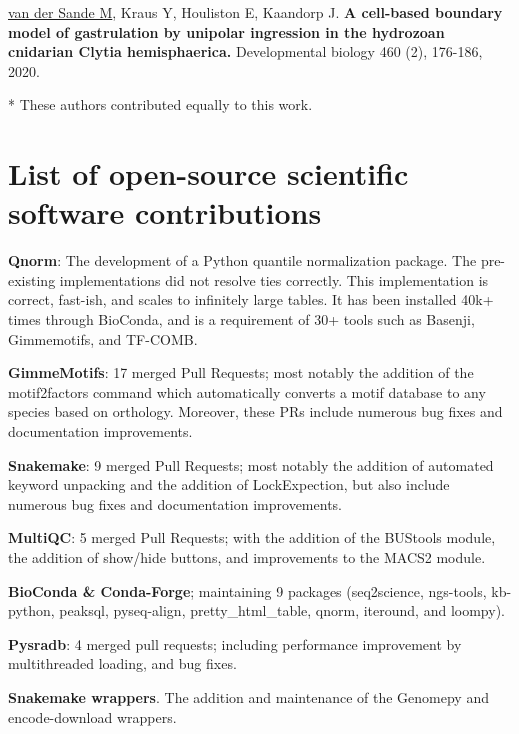 \noindent
\underline{van der Sande M}, Kraus Y, Houliston E, Kaandorp J. \textbf{A cell-based boundary model of gastrulation by unipolar ingression in the hydrozoan cnidarian Clytia hemisphaerica.}  Developmental biology 460 (2), 176-186, 2020.
\newline

\noindent
* These authors contributed equally to this work.

\newpage
\section{List of open-source scientific software contributions}

\noindent
\textbf{Qnorm}: The development of a Python quantile normalization package. The pre-existing implementations did not resolve ties correctly. This implementation is correct, fast-ish, and scales to infinitely large tables. It has been installed 40k+ times through BioConda, and is a requirement of 30+ tools such as Basenji, Gimmemotifs, and TF-COMB.
\newline

\noindent
\textbf{GimmeMotifs}: 17 merged Pull Requests; most notably the addition of the motif2factors command which automatically converts a motif database to any species based on orthology. Moreover, these PRs include numerous bug fixes and documentation improvements.
\newline

\noindent
\textbf{Snakemake}: 9 merged Pull Requests; most notably the addition of automated keyword unpacking and the addition of LockExpection, but also include numerous bug fixes and documentation improvements.
\newline

\noindent
\textbf{MultiQC}: 5 merged Pull Requests; with the addition of the BUStools module, the addition of show/hide buttons, and improvements to the MACS2 module. 
\newline

\noindent
\textbf{BioConda \& Conda-Forge}; maintaining 9 packages (seq2science, ngs-tools, kb-python, peaksql, pyseq-align, pretty\_html\_table, qnorm, iteround, and loompy).
\newline

\noindent
\textbf{Pysradb}: 4 merged pull requests; including performance improvement by multithreaded loading, and bug fixes.
\newline

\noindent
\textbf{Snakemake wrappers}. The addition and maintenance of the Genomepy and encode-download wrappers.
\newline

